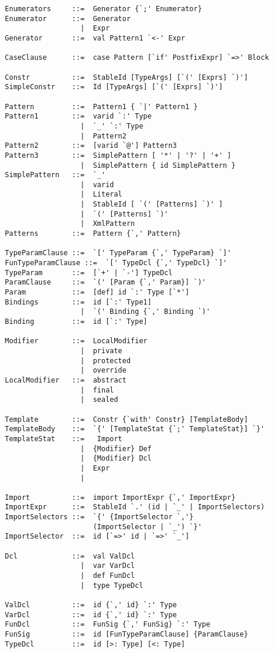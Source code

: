 \begin{lstlisting}
  Enumerators     ::=  Generator {`;' Enumerator}
  Enumerator      ::=  Generator
                    |  Expr
  Generator       ::=  val Pattern1 `<-' Expr

  CaseClause      ::=  case Pattern [`if' PostfixExpr] `=>' Block 

  Constr          ::=  StableId [TypeArgs] [`(' [Exprs] `)']  
  SimpleConstr    ::=  Id [TypeArgs] [`(' [Exprs] `)']  

  Pattern         ::=  Pattern1 { `|' Pattern1 }
  Pattern1        ::=  varid `:' Type
                    |  `_' `:' Type
                    |  Pattern2
  Pattern2        ::=  [varid `@'] Pattern3
  Pattern3        ::=  SimplePattern [ '*' | '?' | '+' ]
                    |  SimplePattern { id SimplePattern }
  SimplePattern   ::=  `_'
                    |  varid
                    |  Literal
                    |  StableId [ `(' [Patterns] `)' ]
                    |  `(' [Patterns] `)'
                    |  XmlPattern
  Patterns        ::=  Pattern {`,' Pattern}

  TypeParamClause ::=  `[' TypeParam {`,' TypeParam} `]'
  FunTypeParamClause ::=  `[' TypeDcl {`,' TypeDcl} `]'
  TypeParam       ::=  [`+' | `-'] TypeDcl
  ParamClause     ::=  `(' [Param {`,' Param}] `)'
  Param           ::=  [def] id `:' Type [`*']
  Bindings        ::=  id [`:' Type1]
                    |  `(' Binding {`,' Binding `)'
  Binding         ::=  id [`:' Type]

  Modifier        ::=  LocalModifier
                    |  private
                    |  protected
                    |  override 
  LocalModifier   ::=  abstract
                    |  final
                    |  sealed

  Template        ::=  Constr {`with' Constr} [TemplateBody]
  TemplateBody    ::=  `{' [TemplateStat {`;' TemplateStat}] `}'
  TemplateStat    ::=   Import
                    |  {Modifier} Def
                    |  {Modifier} Dcl
                    |  Expr
                    |

  Import          ::=  import ImportExpr {`,' ImportExpr}
  ImportExpr      ::=  StableId `.' (id | `_' | ImportSelectors)
  ImportSelectors ::=  `{' {ImportSelector `,'} 
                       (ImportSelector | `_') `}'
  ImportSelector  ::=  id [`=>' id | `=>' `_']

  Dcl             ::=  val ValDcl
                    |  var VarDcl
                    |  def FunDcl
                    |  type TypeDcl

  ValDcl          ::=  id {`,' id} `:' Type
  VarDcl          ::=  id {`,' id} `:' Type
  FunDcl          ::=  FunSig {`,' FunSig} `:' Type
  FunSig          ::=  id [FunTypeParamClause] {ParamClause}
  TypeDcl         ::=  id [>: Type] [<: Type]


\end{lstlisting}
